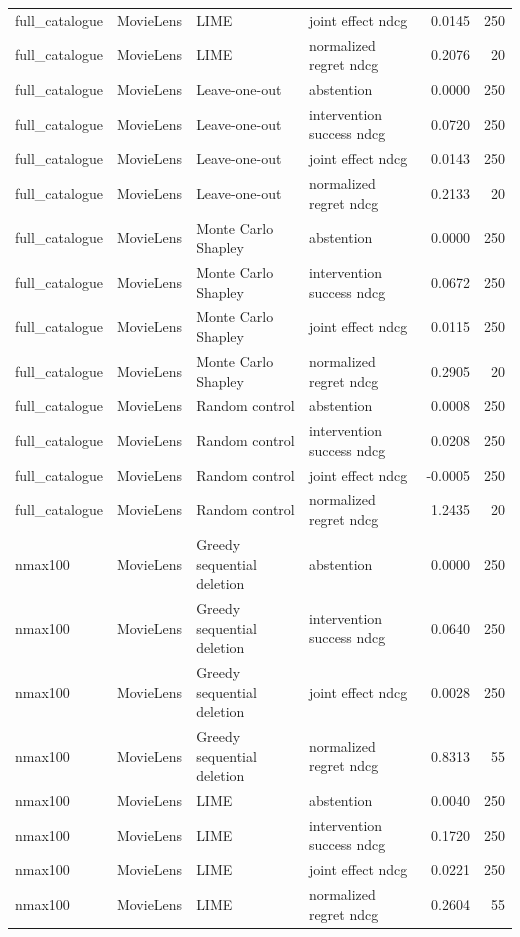 \begin{longtable}{@{}p{.16\linewidth}p{.11\linewidth}p{.15\linewidth}p{.22\linewidth}rr@{}}
full\_catalogue & MovieLens & LIME & joint effect ndcg & 0.0145 & 250 \\
full\_catalogue & MovieLens & LIME & normalized regret ndcg & 0.2076 & 20 \\
full\_catalogue & MovieLens & Leave-one-out & abstention & 0.0000 & 250 \\
full\_catalogue & MovieLens & Leave-one-out & intervention success ndcg & 0.0720 & 250 \\
full\_catalogue & MovieLens & Leave-one-out & joint effect ndcg & 0.0143 & 250 \\
full\_catalogue & MovieLens & Leave-one-out & normalized regret ndcg & 0.2133 & 20 \\
full\_catalogue & MovieLens & Monte Carlo Shapley & abstention & 0.0000 & 250 \\
full\_catalogue & MovieLens & Monte Carlo Shapley & intervention success ndcg & 0.0672 & 250 \\
full\_catalogue & MovieLens & Monte Carlo Shapley & joint effect ndcg & 0.0115 & 250 \\
full\_catalogue & MovieLens & Monte Carlo Shapley & normalized regret ndcg & 0.2905 & 20 \\
full\_catalogue & MovieLens & Random control & abstention & 0.0008 & 250 \\
full\_catalogue & MovieLens & Random control & intervention success ndcg & 0.0208 & 250 \\
full\_catalogue & MovieLens & Random control & joint effect ndcg & -0.0005 & 250 \\
full\_catalogue & MovieLens & Random control & normalized regret ndcg & 1.2435 & 20 \\
nmax100 & MovieLens & Greedy sequential deletion & abstention & 0.0000 & 250 \\
nmax100 & MovieLens & Greedy sequential deletion & intervention success ndcg & 0.0640 & 250 \\
nmax100 & MovieLens & Greedy sequential deletion & joint effect ndcg & 0.0028 & 250 \\
nmax100 & MovieLens & Greedy sequential deletion & normalized regret ndcg & 0.8313 & 55 \\
nmax100 & MovieLens & LIME & abstention & 0.0040 & 250 \\
nmax100 & MovieLens & LIME & intervention success ndcg & 0.1720 & 250 \\
nmax100 & MovieLens & LIME & joint effect ndcg & 0.0221 & 250 \\
nmax100 & MovieLens & LIME & normalized regret ndcg & 0.2604 & 55 \\

\end{longtable}
